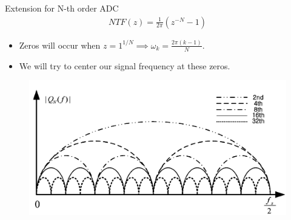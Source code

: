 \documentclass{beamer}
\begin{document}
\begin{frame}{Extension for N-th order ADC}
\vspace{-0.8cm}
\begin{gather*}
	NTF(z) = \frac{1}{2\pi}(z^{-N}-1)	
\end{gather*}
\vspace{-0.7cm}
\pause
\begin{itemize}
	\item Zeros will occur when $z = 1^{1/N} \implies \omega _k = \frac{2 \pi (k-1)}{N}$.
	\pause
	\item We will try to center our signal frequency at these zeros.
\end{itemize}
\pause
\begin{figure}
	\includegraphics[scale=0.25]{./figs/Qorder.png}
\end{figure}
\end{frame}
\end{document}
